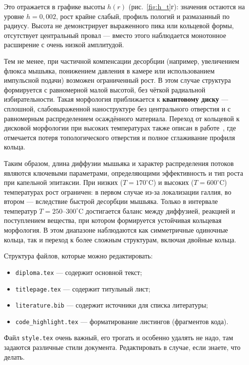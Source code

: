 \documentclass[14pt,oneside]{extarticle}
\begin{document}
Это отражается в графике высоты $h(r)$ (рис.~\ref{fig:h_t}г): значения остаются на уровне $h = 0{,}002$, рост крайне слабый, профиль пологий и размазанный по радиусу. Высота не демонстрирует выраженного пика или кольцевой формы, отсутствует центральный провал — вместо этого наблюдается монотонное расширение с очень низкой амплитудой.

Тем не менее, при частичной компенсации десорбции (например, увеличением флюкса мышьяка, понижением давления в камере или использованием импульсной подачи) возможен ограниченный рост. В этом случае структура формируется с равномерной малой высотой, без чёткой радиальной избирательности. Такая морфология приближается к \textbf{квантовому диску} — сплошной, слабовыраженной наноструктуре без центрального отверстия и с равномерным распределением осаждённого материала. Переход от кольцевой к дисковой морфологии при высоких температурах также описан в работе~\cite{fan2023evaporation}, где отмечается потеря топологического отверстия и полное сглаживание профиля кольца.

Таким образом, длина диффузии мышьяка и характер распределения потоков являются ключевыми параметрами, определяющими эффективность и тип роста при капельной эпитаксии. При низких ($T = 170^\circ$C) и высоких ($T = 600^\circ$C) температурах рост ограничен: в первом случае из-за локализации галлия, во втором — вследствие быстрой десорбции мышьяка. Только в интервале температур $T = 250$–$300^\circ$C достигается баланс между диффузией, реакцией и поступлением вещества, при котором формируется устойчивая кольцевая морфология. В этом диапазоне наблюдаются как симметричные одиночные кольца, так и переход к более сложным структурам, включая двойные кольца.

\pagebreak
{}
Структура файлов, которые можно редактировать:

\begin{itemize}
    \item \verb|diploma.tex| --- содержит основной текст;
    \item \verb|titlepage.tex| --- содержит титульный лист;
    \item \verb|literature.bib| --- содержит источники для списка литературы;
    \item \verb|code_highlight.tex| --- форматирование листингов (фрагментов кода).
\end{itemize}

Файл \verb|style.tex| очень важный, его трогать и особенно удалять не надо, там задаются различные стили документа. Редактировать в случае, если знаете, что делать.
\end{document}
